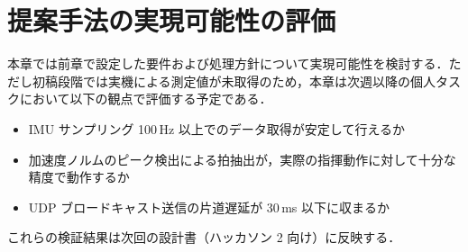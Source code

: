 \section{提案手法の実現可能性の評価}
\label{sec:evaluation}

本章では前章で設定した要件および処理方針について実現可能性を検討する．ただし初稿段階では実機による測定値が未取得のため，本章は次週以降の個人タスクにおいて以下の観点で評価する予定である．

\begin{itemize}
  \item IMU サンプリング 100\,Hz 以上でのデータ取得が安定して行えるか
  \item 加速度ノルムのピーク検出による拍抽出が，実際の指揮動作に対して十分な精度で動作するか
  \item UDP ブロードキャスト送信の片道遅延が 30\,ms 以下に収まるか
\end{itemize}

これらの検証結果は次回の設計書（ハッカソン 2 向け）に反映する．
